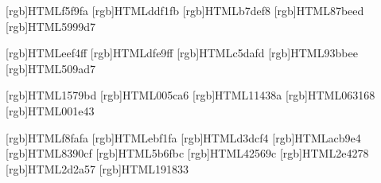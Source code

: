 
\definecolor{ars-50}[rgb]{HTML}{f5f9fa}
\definecolor{ars-100}[rgb]{HTML}{ddf1fb}
\definecolor{ars-200}[rgb]{HTML}{b7def8}
\definecolor{ars-300}[rgb]{HTML}{87beed}
\definecolor{ars-400}[rgb]{HTML}{5999d7}

\definecolor{ars-50}[rgb]{HTML}{eef4ff}
\definecolor{ars-100}[rgb]{HTML}{dfe9ff}
\definecolor{ars-200}[rgb]{HTML}{c5dafd}
\definecolor{ars-300}[rgb]{HTML}{93bbee}
\definecolor{ars-400}[rgb]{HTML}{509ad7}

\definecolor{ars-500}[rgb]{HTML}{1579bd}
\definecolor{ars-600}[rgb]{HTML}{005ca6}
\definecolor{ars-700}[rgb]{HTML}{11438a}
\definecolor{ars-800}[rgb]{HTML}{063168}
\definecolor{ars-900}[rgb]{HTML}{001e43}

\definecolor{umr-50}[rgb]{HTML}{f8fafa}
\definecolor{umr-100}[rgb]{HTML}{ebf1fa}
\definecolor{umr-200}[rgb]{HTML}{d3dcf4}
\definecolor{umr-300}[rgb]{HTML}{acb9e4}
\definecolor{umr-400}[rgb]{HTML}{8390cf}
\definecolor{umr-500}[rgb]{HTML}{5b6fbc}
\definecolor{umr-600}[rgb]{HTML}{42569c}
\definecolor{umr-700}[rgb]{HTML}{2e4278}
\definecolor{umr-800}[rgb]{HTML}{2d2a57}
\definecolor{umr-900}[rgb]{HTML}{191833}
